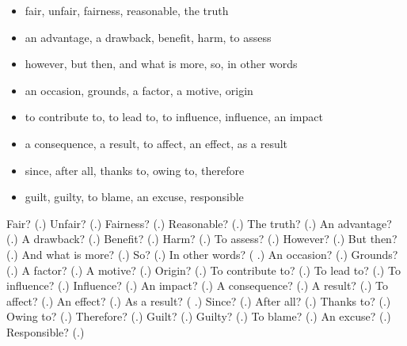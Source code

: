 \begin{itemize}
\raggedright
  \item fair, unfair, fairness, reasonable, the truth
  \item an advantage, a drawback, benefit, harm, to assess
  \item however, but then, and what is more, so, in other words
  \item an occasion, grounds, a factor, a motive, origin
  \item to contribute to, to lead to, to influence, influence, an impact
  \item a consequence, a result, to affect, an effect, as a result
  \item since, after all, thanks to, owing to, therefore
  \item guilt, guilty, to blame, an excuse, responsible
\end{itemize}

\begin{tcolorbox}[breakable,colback=teal!4,colframe=teal!35!black,title={Before you move on}]
Fair? (\textbf{}.) Unfair? (\textbf{}.) Fairness? (\textbf{}.) Reasonable? (\textbf{}.) The truth? (\textbf{}.) An advantage? (\textbf{}.) A drawback? (\textbf{}.) Benefit? (\textbf{}.) Harm? (\textbf{}.) To assess? (\textbf{}.) However? (\textbf{}.) But then? (\textbf{}.) And what is more? (\textbf{}.) So? (\textbf{}.) In other words? (\textbf{ }.) An occasion? (\textbf{}.) Grounds? (\textbf{}.) A factor? (\textbf{}.) A motive? (\textbf{}.) Origin? (\textbf{}.) To contribute to? (\textbf{}.) To lead to? (\textbf{}.) To influence? (\textbf{}.) Influence? (\textbf{}.) An impact? (\textbf{}.) A consequence? (\textbf{}.) A result? (\textbf{}.) To affect? (\textbf{}.) An effect? (\textbf{}.) As a result? (\textbf{ }.) Since? (\textbf{}.) After all? (\textbf{}.) Thanks to? (\textbf{}.) Owing to? (\textbf{}.) Therefore? (\textbf{}.) Guilt? (\textbf{}.) Guilty? (\textbf{}.) To blame? (\textbf{}.) An excuse? (\textbf{}.) Responsible? (\textbf{}.)
\end{tcolorbox}
